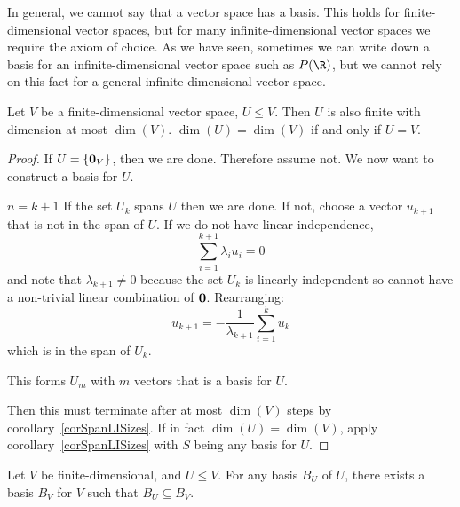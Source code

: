 \documentclass[../Main.tex]{subfiles}
\begin{document}
\begin{remark}
    In general, we cannot say that a vector space has a basis. This holds for finite-dimensional vector spaces, but for many infinite-dimensional vector spaces we require the axiom of choice. As we have seen, sometimes we can write down a basis for an infinite-dimensional vector space such as $P(\R)$, but we cannot rely on this fact for a general infinite-dimensional vector space.
\end{remark}
\begin{corollary}
    Let $V$ be a finite-dimensional vector space, $U \leq V$. Then $U$ is also finite with dimension at most $\dim(V)$. $\dim(U) = \dim(V)$ if and only if $U = V$.
    \label{corSubspaceDim}
\end{corollary}
\begin{proof}
    If $U = \{\boldsymbol{0}_V\}$, then we are done. Therefore assume not. We now want to construct a basis for $U$.

    {$n = k + 1$}{
        If the set $U_k$ spans $U$ then we are done. If not, choose a vector $u_{k+1}$ that is not in the span of $U$. If we do not have linear independence,
        \begin{equation*}
            \sum_{i = 1}^{k+1} \lambda_iu_{i} = 0
        \end{equation*}
        and note that $\lambda_{k+1} \neq 0$ because the set $U_k$ is linearly independent so cannot have a non-trivial linear combination of $\boldsymbol{0}$.
        Rearranging:
        \begin{equation*}
            u_{k + 1} = -\frac{1}{\lambda_{k+1}} \sum_{i=1}^{k} u_k
        \end{equation*}
        which is in the span of $U_k$.~\contradiction
    }

    This forms $U_m$ with $m$ vectors that is a basis for $U$.

    Then this must terminate after at most $\dim(V)$ steps by corollary~\ref{corSpanLISizes}. If in fact $\dim(U) = \dim(V)$, apply corollary~\ref{corSpanLISizes} with $S$ being any basis for $U$.
\end{proof}
\begin{proposition}
    Let $V$ be finite-dimensional, and $U \leq V$. For any basis $B_U$ of $U$, there exists a basis $B_V$ for $V$ such that $B_U \subseteq B_V$.
    \label{propBasisExtension}
\end{proposition}
\end{document}
